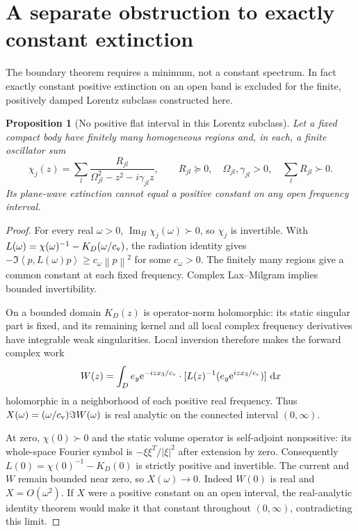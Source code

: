 \documentclass[11pt]{article}
\newtheorem{proposition}{Proposition}
\newcommand{\ImH}{\operatorname{Im}_{H}}
\newcommand{\norm}[1]{\left\lVert#1\right\rVert}
\newcommand{\abs}[1]{\left|#1\right|}
\newcommand{\ip}[2]{\left\langle#1,#2\right\rangle}
\newcommand{\dd}{\,\mathrm d}
\newcommand{\ee}{\mathrm e}
\begin{document}
\section{A separate obstruction to exactly constant extinction}
The boundary theorem requires a minimum, not a constant spectrum.
In fact exactly constant positive extinction on an open band is excluded
for the finite, positively damped Lorentz subclass constructed here.

\begin{proposition}[No positive flat interval in this Lorentz subclass]
Let a fixed compact body have finitely many homogeneous regions and, in each,
a finite oscillator sum
\[
 \chi_j(z)=\sum_l
 \frac{R_{jl}}{\Omega_{jl}^2-z^2-i\gamma_{jl}z},\qquad
 R_{jl}\succeq0,\quad
 \Omega_{jl},\gamma_{jl}>0,\quad
 \sum_lR_{jl}\succ0.
\]
Its plane-wave extinction cannot equal a positive constant on any open
frequency interval.
\end{proposition}
\begin{proof}
For every real $\omega>0$, $\ImH\chi_j(\omega)\succ0$, so $\chi_j$ is
invertible. With $L(\omega)=\chi(\omega)^{-1}-K_D(\omega/c_{\rm v})$,
the radiation identity gives
$-\Im\ip p{L(\omega)p}\ge c_\omega\norm p^2$ for some $c_\omega>0$.
The finitely many regions give a common constant at each fixed frequency.
Complex Lax--Milgram implies bounded invertibility.

On a bounded domain $K_D(z)$ is operator-norm holomorphic: its static
singular part is fixed, and its remaining kernel and all local complex
frequency derivatives have integrable weak singularities.
Local inversion therefore makes the forward complex work
\[
 W(z)=\int_D e_y\ee^{-izx_3/c_{\rm v}}\cdot
 [L(z)^{-1}(e_y\ee^{izx_3/c_{\rm v}})]\,\dd x
\]
holomorphic in a neighborhood of each positive real frequency.
Thus $X(\omega)=(\omega/c_{\rm v})\Im W(\omega)$ is real analytic on
the connected interval $(0,\infty)$.

At zero, $\chi(0)\succ0$ and the static volume operator is self-adjoint
nonpositive: its whole-space Fourier symbol is
$-\xi\xi^T/\abs\xi^2$ after extension by zero.
Consequently $L(0)=\chi(0)^{-1}-K_D(0)$ is strictly positive and invertible.
The current and $W$ remain bounded near zero, so $X(\omega)\to0$.
Indeed $W(0)$ is real and $X=O(\omega^2)$.
If $X$ were a positive constant on an open interval, the real-analytic
identity theorem would make it that constant throughout $(0,\infty)$,
contradicting this limit.
\end{proof}
\end{document}
